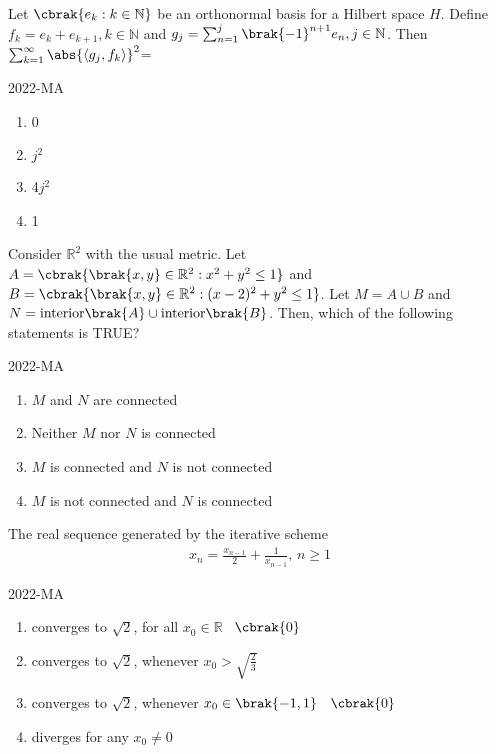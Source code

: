 \item Let $\cbrak{e_k : k \in \mathbb{N}}$ be an orthonormal basis for a Hilbert space $H$. Define $f_k = e_k +e_{k+1}, k\in \mathbb{N}$ and $g_j = \sum^{j} _{n=1} \brak{-1}^{n+1} e_n, j \in \mathbb{N}$. Then $\sum _{k=1} ^{\infty} \abs{\langle g_j, f_k \rangle}^{2}$=
	
	\hfill{2022-MA}

	 \begin{enumerate}
		\item 0
		\item $j^2$
		\item 4$j^2$
		\item 1
	 \end{enumerate}

 \item Consider $\mathbb{R}^2$ with the usual metric. Let $A=\cbrak{\brak{x,y} \in \mathbb{R}^2 : x^2+y^2 \leq 1}$ and $B=\cbrak{\brak{x,y} \in \mathbb{R}^2 : (x-2)^2+y^2 \leq 1}$. Let $M=A \cup B$ and $N=\text{interior}\brak{A} \cup \text{interior}\brak{B}$. Then, which of the following statements is TRUE?
	 
	 \hfill{2022-MA}

	 \begin{enumerate}
		\item $M$ and $N$ are connected
		\item Neither $M$ nor $N$ is connected
		\item $M$ is connected and $N$ is not connected
		\item $M$ is not connected and $N$ is connected
	\end{enumerate}

\item The real sequence generated by the iterative scheme
	\begin{align*}
		x_n=\frac{x_{n-1}}{2}+\frac{1}{x_{n-1}}, \, n\geq 1
	\end{align*}
	
	\hfill{2022-MA}

 	
	\begin{enumerate}
		\item converges to $\sqrt{2}$, for all $x_0 \in \mathbb{R}$ \ $\cbrak{0}$
		\item converges to $\sqrt{2}$, whenever $x_0 > \sqrt{\frac{2}{3}}$
		\item converges to $\sqrt{2}$, whenever $x_0 \in \brak{-1,1}$ \ $\cbrak{0}$
		\item diverges for any $x_0 \neq 0$
	\end{enumerate}


